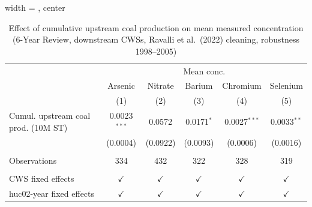 
\begin{table}[htbp]
   
   \caption{\label{tab:6yr_huc02fe_inorg_val_ravalli_2005} Effect of cumulative upstream coal production on mean measured concentration (6-Year Review, downstream CWSs, Ravalli et al.~(2022) cleaning, robustness 1998--2005)}
   \bigskip
   
   \centering
   
   \begin{adjustbox}{width = \textwidth, center}
      
      
      \begin{tabular}{lccccc}
         \toprule
         
          & \multicolumn{5}{c}{Mean conc.}\\
         
                                             & Arsenic        & Nitrate       & Barium        & Chromium       & Selenium \\   
         
                                             & (1)            & (2)           & (3)           & (4)            & (5)\\  
         
         \midrule 
         Cumul. upstream coal prod. (10M ST) & 0.0023$^{***}$ & 0.0572        & 0.0171$^{*}$  & 0.0027$^{***}$ & 0.0033$^{**}$\\   
                                             & (0.0004)       & (0.0922)      & (0.0093)      & (0.0006)       & (0.0016)\\   
         
          \\
         
         Observations                        & 334            & 432           & 322           & 328            & 319\\  
         
          \\
         
         CWS fixed effects                   & $\checkmark$   & $\checkmark$  & $\checkmark$  & $\checkmark$   & $\checkmark$\\   
         huc02-year fixed effects            & $\checkmark$   & $\checkmark$  & $\checkmark$  & $\checkmark$   & $\checkmark$\\   
         
         \bottomrule
         

\end{tabular}
\end{adjustbox}
\end{table}
